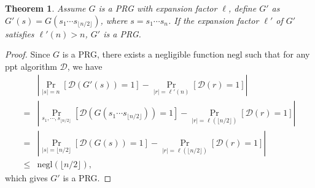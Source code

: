 \documentclass[a4paper]{article}
\newtheorem{theorem}{Theorem}
\newtheorem*{proof}{Proof}
\newcommand{\abs}[1]{\left| #1 \right|}
\newcommand{\sbra}[1]{\left[ #1 \right]}
\newcommand{\negl}{\mathrm{negl}}
\newcommand{\ppt}{{\sc ppt} }
\begin{document}
\begin{theorem}\label{ap3}
    Assume $G$ is a PRG with expansion factor $\ell$, 
    define $G'$ as $G'(s)=G(s_1\cdots s_{\lfloor n/2\rfloor})$, where $s=s_1\cdots s_n$.
    If the expansion factor $\ell'$ of $G'$ satisfies $\ell'(n)>n$, $G'$ is a PRG.
\end{theorem}
\begin{proof}
    Since $G$ is a PRG, there exists a negligible function $\negl$ such that
    for any \ppt algorithm $\mathcal D$, we have
    \begin{align*}
        &\abs{\Pr_{|s|=n}\sbra{\mathcal D(G'(s))=1}-\Pr_{|r|=\ell'(n)}\sbra{\mathcal D(r)=1}}\\
        =&
        \abs{\Pr_{s_1,\cdots,s_{\lfloor n/2\rfloor}}\sbra{\mathcal D(G(s_1\cdots s_{\lfloor n/2\rfloor}))=1}
        -\Pr_{|r|=\ell(\lfloor n/2\rfloor)}\sbra{\mathcal D(r)=1}}\\
        =&
        \abs{\Pr_{|s|=\lfloor n/2\rfloor}\sbra{\mathcal D(G(s))=1}
        -\Pr_{|r|=\ell(\lfloor n/2\rfloor)}\sbra{\mathcal D(r)=1}}\\
        \leq&\negl(\lfloor n/2\rfloor),
    \end{align*}
    which gives $G'$ is a PRG.
\end{proof}
\end{document}
